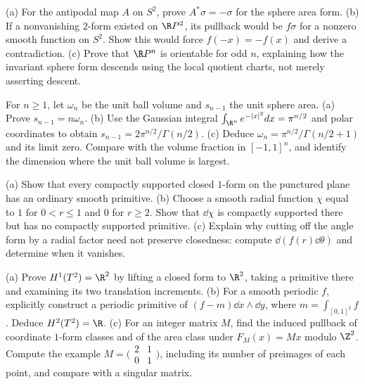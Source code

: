 \begin{exercise}[$\star\star$]\label{ex:mobius}
(a) For the antipodal map $A$ on $S^2$, prove $A^*\sigma=-\sigma$ for the sphere area form.
(b) If a nonvanishing $2$-form existed on $\R P^2$, its pullback would be $f\sigma$ for a nonzero smooth function on $S^2$. Show this would force $f(-x)=-f(x)$ and derive a contradiction.
(c) Prove that $\R P^n$ is orientable for odd $n$, explaining how the invariant sphere form descends using the local quotient charts, not merely asserting descent.
\end{exercise}

\begin{exercise}[$\star\star$]\label{ex:spherevolume}
For $n\ge1$, let $\omega_n$ be the unit ball volume and $s_{n-1}$ the unit sphere area.
(a) Prove $s_{n-1}=n\omega_n$.
(b) Use the Gaussian integral $\int_{\R^n}e^{-|x|^2}dx=\pi^{n/2}$ and polar coordinates to obtain $s_{n-1}=2\pi^{n/2}/\Gamma(n/2)$.
(c) Deduce $\omega_n=\pi^{n/2}/\Gamma(n/2+1)$ and its limit zero. Compare with the volume fraction in $[-1,1]^n$, and identify the dimension where the unit ball volume is largest.
\end{exercise}

\begin{exercise}[$\star\star$]\label{ex:v9-ch03-compact-potential}
(a) Show that every compactly supported closed $1$-form on the punctured plane has an ordinary smooth primitive.
(b) Choose a smooth radial function $\chi$ equal to $1$ for $0<r\le1$ and $0$ for $r\ge2$. Show that $\dd\chi$ is compactly supported there but has no compactly supported primitive.
(c) Explain why cutting off the angle form by a radial factor need not preserve closedness: compute $\dd(f(r)\dd\theta)$ and determine when it vanishes.
\end{exercise}

\begin{exercise}[$\star\star\star$]\label{ex:v9-ch03-torus-periods}
(a) Prove $H^1(T^2)=\R^2$ by lifting a closed form to $\R^2$, taking a primitive there and examining its two translation increments.
(b) For a smooth periodic $f$, explicitly construct a periodic primitive of $(f-m)\dd x\wedge\dd y$, where $m=\int_{[0,1]^2}f$. Deduce $H^2(T^2)=\R$.
(c) For an integer matrix $M$, find the induced pullback of coordinate $1$-form classes and of the area class under $F_M(x)=Mx$ modulo $\Z^2$. Compute the example $M=\bigl(\begin{smallmatrix}2&1\\0&1\end{smallmatrix}\bigr)$, including its number of preimages of each point, and compare with a singular matrix.
\end{exercise}

